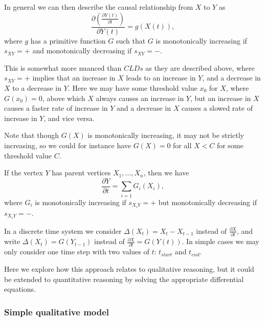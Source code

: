 In general we can then describe the causal relationship from $X$ to
$Y$ as
%
\[\frac{\partial\left( \frac{\partial Y(t)}{\partial t} \right)}{\partial Y(t)} =
  g(X(t)),\]
%
where $g$ has a primitive function $G$ such that $G$ is monotonically
increasing if $s_{XY}=+$ and monotonically decreasing if $s_{XY}= -$.

This is somewhat more nuanced than $CLDs$ as they are described above,
where $s_{XY}=+$ implies that an increase in $X$ leads to an increase
in $Y$, and a decrease in $X$ to a decrease in $Y$.
%
Here we may have some threshold value $x_0$ for $X$, where
$G(x_0) = 0$, above which $X$ always causes an increase in $Y$, but an
increase in $X$ causes a faster rate of increase in $Y$ and a decrease
in $X$ causes a slowed rate of increase in $Y$, and vice versa.

Note that though $G(X)$ is monotonically increasing, it may not be
strictly increasing, so we could for instance have $G(X) = 0$ for all
$X < C$ for some threshold value $C$.

If the vertex $Y$ has parent vertices $X_1,\ldots,X_n$, then we have
\[\frac{\partial Y}{\partial t} = \sum_{i=1}G_i(X_i),\]
where $G_i$ is monotonically increasing if $s_{X_iY}=+$ but monotonically
decreasing if $s_{X_iY}=-$.

In a discrete time system we consider $\Delta(X_t) = X_t - X_{t-1}$
instead of $\frac{\partial X}{\partial t}$, and write
$\Delta(X_t) = G(Y_{t-1})$ instead of
$\frac{\partial X}{\partial t} = G(Y(t))$.
%
In simple cases we may only consider one time step with two values of
$t$: $t_{start}$ and $t_{end}$.

Here we explore how this approach relates to qualitative reasoning,
but it could be extended to quantitative reasoning by solving the
appropriate differential equations.

\subsubsection{Simple qualitative model}

